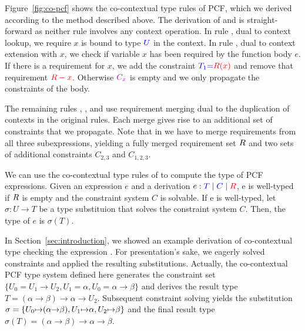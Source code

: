 \documentclass{llncs}
\begin{document}
Figure~\ref{fig:co-pcf} shows the co-contextual type rules of PCF, which we
derived according to the method described above. The derivation of
 and  is straight-forward as neither rule
involves any context operation. In rule , dual to context
lookup, we require $x$ is bound to type $\typecolor{U}$ in the context. In rule
, dual to context extension with $x$, we check if variable $x$
has been required by the function body $e$. If there is a requirement for $x$,
we add the constraint $\typecolor{T_1} \typecolor{=} \ctxcolor{\reqs(x)}$ and
remove that requirement $\ctxcolor{\reqs - x}$. Otherwise $\typectxcolor{C_x}$
is empty and we only propagate the constraints of the body.

The remaining rules
, , and  use requirement merging
dual to the duplication of contexts in the original rules. Each merge gives rise
to an additional set of constraints that we propagate. Note that in
 we have to merge requirements from all three subexpressions,
yielding a fully merged requirement set $R$ and two sets of additional
constraints $C_{2,3}$ and $C_{1,2,3}$.

We can use the co-contextual type rules of to compute the type of PCF
expressions. Given an expression $e$ and a derivation $\cojudge e T C \reqs$, e
is well-typed if $R$ is empty and the constraint system $C$ is solvable. If
e is well-typed, let $\sigma : U \to T$ be a type substituion that solves the
constraint system $C$. Then, the type of $e$ is $\sigma(T)$.

In Section~\ref{sec:introduction}, we showed an example derivation of
co-contextual type checking the expression
. For presentation's sake,
we eagerly solved constraints and applied the resulting substitutions. Actually,
the co-contextual PCF type system defined here generates the constraint set
$\{U_0 = U_1 \to U_2, U_1 = \alpha, U_0 = \alpha \to \beta\}$ and derives the
result type $T = (\alpha \to \beta) \to \alpha \to U_2$. Subsequent constraint
solving yields the substitution $\sigma = \{U_0 \smap\, (\alpha \!\to\! \beta), U_1 \smap
\alpha, U_2 \smap \beta\}$ and the final result type $\sigma(T) = (\alpha \to \beta)
\to \alpha \to \beta$.
\end{document}
